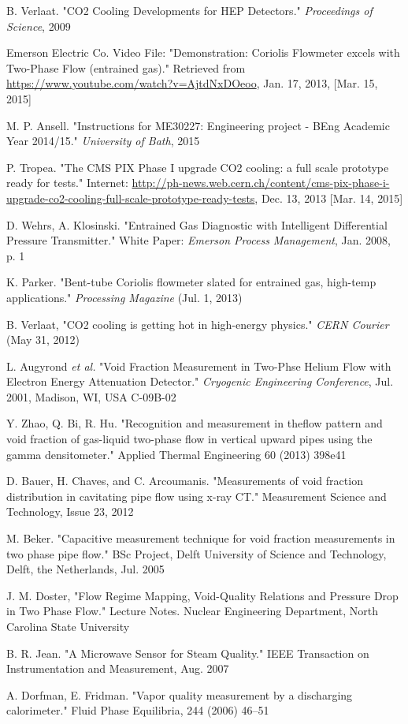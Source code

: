 \documentclass{report}
\begin{document}
\begin{thebibliography}{9}
B. Verlaat. "CO2 Cooling Developments for HEP Detectors." \textit{Proceedings of Science}, 2009

Emerson Electric Co. Video File: "Demonstration: Coriolis Flowmeter excels with Two-Phase Flow (entrained gas)." Retrieved from \underline{https://www.youtube.com/watch?v=AjtdNxDOeoo}, Jan. 17, 2013, [Mar. 15, 2015]

M. P. Ansell. "Instructions for ME30227: Engineering project - BEng Academic Year 2014/15." \textit{University of Bath}, 2015

P. Tropea. "The CMS PIX Phase I upgrade CO2 cooling: a full scale prototype ready for tests." Internet: \underline{http://ph-news.web.cern.ch/content/cms-pix-phase-i-upgrade-co2-cooling-full-scale-prototype-ready-tests}, Dec. 13, 2013 [Mar. 14, 2015] 

D. Wehrs, A. Klosinski. "Entrained Gas Diagnostic with Intelligent Differential Pressure Transmitter." White Paper: \textit{Emerson Process Management}, Jan. 2008, p. 1

K. Parker. "Bent-tube Coriolis flowmeter slated for entrained gas, high-temp applications." \textit{Processing Magazine} (Jul. 1, 2013)

B. Verlaat, "CO2 cooling is getting hot in high-energy physics." \textit{CERN Courier} (May 31, 2012)

L. Augyrond \textit{et al.} "Void Fraction Measurement in Two-Phse Helium Flow with Electron Energy Attenuation Detector." \textit{Cryogenic Engineering Conference}, Jul. 2001, Madison, WI, USA C-09B-02

Y. Zhao, Q. Bi, R. Hu. "Recognition and measurement in theflow pattern and void fraction of gas-liquid two-phase flow in vertical upward pipes using the gamma densitometer." Applied Thermal Engineering 60 (2013) 398e41

D. Bauer, H. Chaves, and C. Arcoumanis. "Measurements of void fraction distribution in cavitating pipe flow
using x-ray CT." Measurement Science and Technology, Issue 23, 2012

M. Beker. "Capacitive measurement technique for void fraction measurements in two phase pipe flow." BSc Project, Delft University of Science and Technology, Delft, the Netherlands, Jul. 2005

J. M. Doster, "Flow Regime Mapping, Void-Quality Relations and Pressure Drop in Two Phase Flow." Lecture Notes. Nuclear Engineering Department, North Carolina State University 

B. R. Jean. "A Microwave Sensor for Steam Quality." IEEE Transaction on Instrumentation and Measurement, Aug. 2007

A. Dorfman, E. Fridman. "Vapor quality measurement by a discharging calorimeter." Fluid Phase Equilibria, 244 (2006) 46–51


\end{thebibliography}
\fi
\appendix
\end{document}
